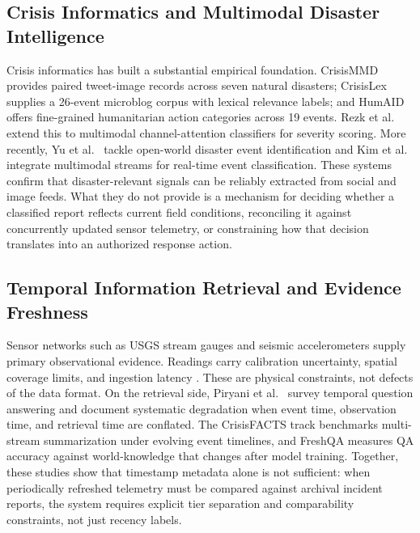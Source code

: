 \documentclass[conference]{IEEEtran}
\begin{document}
\subsection{Crisis Informatics and Multimodal Disaster Intelligence}
Crisis informatics has built a substantial empirical foundation. CrisisMMD \cite{crisismmd} provides paired tweet-image records across seven natural disasters; CrisisLex \cite{olteanu2014} supplies a 26-event microblog corpus with lexical relevance labels; and HumAID \cite{humaid} offers fine-grained humanitarian action categories across 19 events. Rezk et al.\ \cite{rezk2023} extend this to multimodal channel-attention classifiers for severity scoring. More recently, Yu et al.\ \cite{yu2025} tackle open-world disaster event identification and Kim et al.\ \cite{kim2025} integrate multimodal streams for real-time event classification. These systems confirm that disaster-relevant signals can be reliably extracted from social and image feeds. What they do not provide is a mechanism for deciding whether a classified report reflects current field conditions, reconciling it against concurrently updated sensor telemetry, or constraining how that decision translates into an authorized response action.

\subsection{Temporal Information Retrieval and Evidence Freshness}
Sensor networks such as USGS stream gauges and seismic accelerometers supply primary observational evidence. Readings carry calibration uncertainty, spatial coverage limits, and ingestion latency \cite{manuel2024}. These are physical constraints, not defects of the data format. On the retrieval side, Piryani et al.\ \cite{piryani2023} survey temporal question answering and document systematic degradation when event time, observation time, and retrieval time are conflated. The CrisisFACTS track \cite{crisisfacts} benchmarks multi-stream summarization under evolving event timelines, and FreshQA \cite{freshqa} measures QA accuracy against world-knowledge that changes after model training. Together, these studies show that timestamp metadata alone is not sufficient: when periodically refreshed telemetry must be compared against archival incident reports, the system requires explicit tier separation and comparability constraints, not just recency labels.
\end{document}
